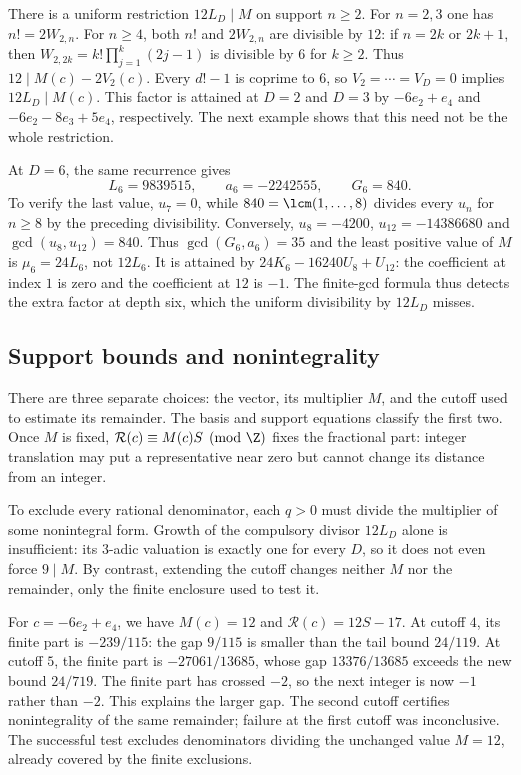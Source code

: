 There is a uniform restriction $12L_D\mid M$ on support $n\ge2$.
For $n=2,3$ one has $n!=2W_{2,n}$. For $n\ge4$, both $n!$ and
$2W_{2,n}$ are divisible by $12$: if $n=2k$ or $2k+1$, then
$W_{2,2k}=k!\prod_{j=1}^k(2j-1)$ is divisible by $6$ for $k\ge2$.
Thus $12\mid M(c)-2V_2(c)$. Every $d!-1$ is coprime to $6$, so
$V_2=\cdots=V_D=0$ implies $12L_D\mid M(c)$.
This factor is attained at $D=2$ and $D=3$ by
$-6e_2+e_4$ and $-6e_2-8e_3+5e_4$, respectively.
The next example shows that this need not be the whole restriction.

At $D=6$, the same recurrence
gives
\[
 L_6=9839515,\qquad a_6=-2242555,\qquad G_6=840.
\]
To verify the last value, $u_7=0$, while $840=\lcm(1,\ldots,8)$ divides
every $u_n$ for $n\ge8$ by the preceding divisibility. Conversely,
$u_8=-4200$, $u_{12}=-14386680$ and $\gcd(u_8,u_{12})=840$.
Thus $\gcd(G_6,a_6)=35$ and the least positive value of $M$ is $\mu_6=24L_6$,
not $12L_6$. It is attained by $24K_6-16240U_8+U_{12}$: the coefficient
at index $1$ is zero and the coefficient at $12$ is $-1$. The finite-gcd formula thus detects the extra factor at depth six,
which the uniform divisibility by $12L_D$ misses.

\subsection{Support bounds and nonintegrality}\label{long68:sec:support-and-remainder}

There are three separate choices: the vector, its multiplier $M$,
and the cutoff used to estimate its remainder. The basis and support
equations classify the first two. Once $M$ is fixed,
$\mathcal R(c)\equiv M(c)S\pmod{\Z}$ fixes the fractional part:
integer translation may put a representative near zero but cannot
change its distance from an integer.

To exclude every rational denominator, each $q>0$ must divide the
multiplier of some nonintegral form. Growth of the compulsory divisor
$12L_D$ alone is insufficient: its $3$-adic valuation is exactly one
for every $D$, so it does not even force $9\mid M$. By contrast,
extending the cutoff changes neither $M$ nor the remainder, only the
finite enclosure used to test it.

For $c=-6e_2+e_4$, we have $M(c)=12$ and $\mathcal R(c)=12S-17$. At cutoff $4$, its finite part is $-239/115$:
the gap $9/115$ is smaller than the tail bound $24/119$. At cutoff $5$,
the finite part is $-27061/13685$, whose gap $13376/13685$ exceeds the
new bound $24/719$. The finite part has crossed $-2$, so the next
integer is now $-1$ rather than $-2$. This explains the larger gap.
The second cutoff certifies nonintegrality of the same remainder;
failure at the first cutoff was inconclusive. The successful test
excludes denominators dividing the unchanged value $M=12$, already
covered by the finite exclusions.

